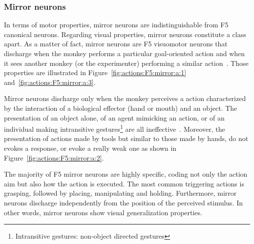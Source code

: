 
\subsubsection{Mirror neurons}
\label{sec:actions:F5:visuomotor:mirror}
In terms of motor properties, mirror neurons are indistinguishable from F5
canonical neurons.
Regarding visual properties, mirror neurons constitute a class apart.
As a matter of fact, mirror neurons are F5 visuomotor neurons that discharge
when the monkey performs a particular goal-oriented action and when it sees
another monkey (or the experimenter) performing a similar
action~\citep{rizzolatti.fadiga:1998}.
Those properties are illustrated in Figure~\ref{fig:actions:F5:mirror:a:1}
and~\ref{fig:actions:F5:mirror:a:3}.

Mirror neurons discharge only when the monkey perceives a action characterized
by the interaction of a biological effector (hand or mouth) and an object. 
The presentation of an object alone, of an agent mimicking an action, or of an
individual making intransitive
gestures\footnote{Intransitive gestures: non-object directed gestures} are all
ineffective~\citep{fadiga.etal:PRESS}.
Moreover, the presentation of actions made by tools but similar to those made by
hands, do not evokes a response, or evoke a really weak one as shown in 
Figure~\ref{fig:actions:F5:mirror:a:2}.

The majority of F5 mirror neurons are highly specific, coding not only the
action aim but also how the action is executed. 
The most common triggering actions is grasping, followed by placing,
manipulating and holding.
Furthermore, mirror neurons discharge independently from the position of the
perceived stimulus. In other words, mirror neurons show visual generalization
properties.

